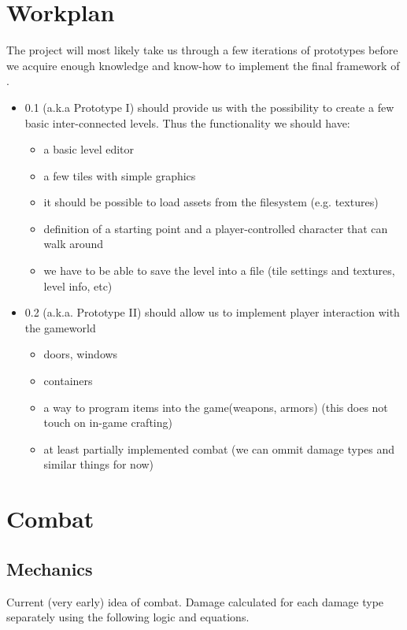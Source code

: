 \documentclass[a4paper,10pt]{book}
\begin{document}
\chapter{Workplan}
The project will most likely take us through a few iterations of prototypes before we acquire enough knowledge and know-how to implement the final framework of \Enginename{}.

\begin{itemize}
  \item \Enginename{} 0.1 (a.k.a Prototype I) should provide us with the possibility to create a few basic inter-connected levels. Thus the functionality we should have:
  \begin{itemize}
    \item a basic level editor
    \item a few tiles with simple graphics
    \item it should be possible to load assets from the filesystem (e.g. textures)
    \item definition of a starting point and a player-controlled character that can walk around
    \item we have to be able to save the level into a file (tile settings and textures, level info, etc)
  \end{itemize}
  \item \Enginename{} 0.2 (a.k.a. Prototype II) should allow us to implement player interaction with the gameworld
  \begin{itemize}
    \item doors, windows
    \item containers
    \item a way to program items into the game(weapons, armors) (this does not touch on in-game crafting)
    \item at least partially implemented combat (we can ommit damage types and
      similar things for now)
  \end{itemize}
\end{itemize}

\chapter{Combat}

\section{Mechanics}
Current (very early) idea of combat. Damage calculated for each damage type
separately using the following logic and equations.
\end{document}
